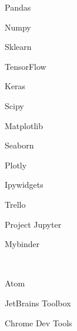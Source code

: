     \begin{cvskills}{8}
                {\faPython}         %
                {                   %
                    \begin{cvitems}
                        \item {Pandas}
                        \item {Numpy}
                        \item {Sklearn}
                        \item {TensorFlow}
                        \item {Keras}
                        \item {Scipy}
                    \end{cvitems}
                }
                {\faLineChart}  %
                {               %
                    \begin{cvitems}
                        \item {Matplotlib}
                        \item {Seaborn}
                        \item {Plotly}
                        \item {Ipywidgets}
                    \end{cvitems}
                }
                {\faUsers}      %
                {               %
                    \begin{cvitems}
                        \item {Trello}
                        \item {Project Jupyter}
                        \item {Mybinder}
                    \end{cvitems}
                }
    \end{cvskills}

\\
    \begin{cvitems}
        \item {Atom}
        \item {JetBrains Toolbox}
        \item {Chrome Dev Tools}
    \end{cvitems}

\vspace{5mm}

    \faHockeyPuck~
    \faDumbbell~
    \faHeadphones~
    \faFutbolR~
